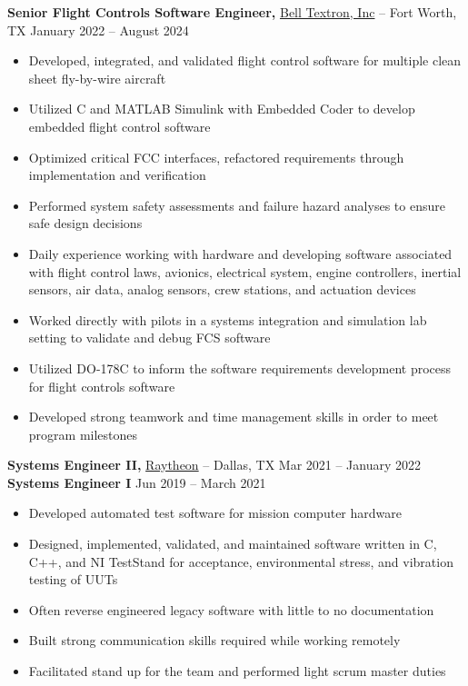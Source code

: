 \documentclass[11pt]{article}       %
\begin{document}
\textbf{Senior Flight Controls Software Engineer,} \href{https://www.bellflight.com/}{Bell Textron, Inc} -- Fort Worth, TX \hfill January 2022 -- August 2024 \\
\vspace{-9pt}
\begin{itemize}
  \item Developed, integrated, and validated flight control software for multiple clean sheet fly-by-wire aircraft
  \item Utilized C and MATLAB Simulink with Embedded Coder to develop embedded flight control software
  \item Optimized critical FCC interfaces, refactored requirements through implementation and verification
  \item Performed system safety assessments and failure hazard analyses to ensure safe design decisions
  \item Daily experience working with hardware and developing software associated with flight control laws, avionics, electrical system, engine controllers, inertial sensors, air data, analog sensors, crew stations, and actuation devices
  \item Worked directly with pilots in a systems integration and simulation lab setting to validate and debug FCS software
  \item Utilized DO-178C to inform the software requirements development process for flight controls software
  \item Developed strong teamwork and time management skills in order to meet program milestones
\end{itemize}

\textbf{Systems Engineer II,} \href{https://www.rtx.com/}{Raytheon} -- Dallas, TX \hfill Mar 2021 -- January 2022 \\
\textbf{Systems Engineer I} \hfill Jun 2019 -- March 2021 \\
\vspace{-9pt}
\begin{itemize}
  \item Developed automated test software for mission computer hardware
  \item Designed, implemented, validated, and maintained software written in C, C++, and NI TestStand for acceptance, environmental stress, and vibration testing of UUTs
  \item Often reverse engineered legacy software with little to no documentation
  \item Built strong communication skills required while working remotely
  \item Facilitated stand up for the team and performed light scrum master duties
\end{itemize}
\end{document}
